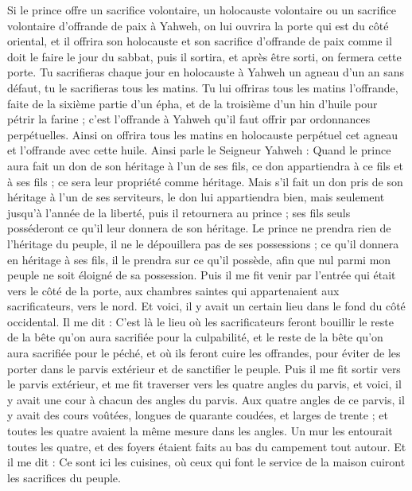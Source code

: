\begin{multicols}{2}
Si le prince offre un sacrifice volontaire, un holocauste volontaire ou un sacrifice volontaire d’offrande de paix à Yahweh, on lui ouvrira la porte qui est du côté oriental, et il offrira son holocauste et son sacrifice d’offrande de paix comme il doit le faire le jour du sabbat, puis il sortira, et après être sorti, on fermera cette porte.
Tu sacrifieras chaque jour en holocauste à Yahweh un agneau d'un an sans défaut, tu le sacrifieras tous les matins.
Tu lui offriras tous les matins l’offrande, faite de la sixième partie d'un épha, et de la troisième d'un hin d'huile pour pétrir la farine ; c'est l’offrande à Yahweh qu'il faut offrir par ordonnances perpétuelles.
Ainsi on offrira tous les matins en holocauste perpétuel cet agneau et l’offrande avec cette huile.
Ainsi parle le Seigneur Yahweh : Quand le prince aura fait un don de son héritage à l’un de ses fils, ce don appartiendra à ce fils et à ses fils ; ce sera leur propriété comme héritage.
Mais s'il fait un don pris de son héritage à l'un de ses serviteurs, le don lui appartiendra bien, mais seulement jusqu’à l’année de la liberté, puis il retournera au prince ; ses fils seuls posséderont ce qu’il leur donnera de son héritage.
Le prince ne prendra rien de l'héritage du peuple, il ne le dépouillera pas de ses possessions ; ce qu’il donnera en héritage à ses fils, il le prendra sur ce qu’il possède, afin que nul parmi mon peuple ne soit éloigné de sa possession.
Puis il me fit venir par l'entrée qui était vers le côté de la porte, aux chambres saintes qui appartenaient aux sacrificateurs, vers le nord. Et voici, il y avait un certain lieu dans le fond du côté occidental.
Il me dit : C'est là le lieu où les sacrificateurs feront bouillir le reste de la bête qu’on aura sacrifiée pour la culpabilité, et le reste de la bête qu’on aura sacrifiée pour le péché, et où ils feront cuire les offrandes, pour éviter de les porter dans le parvis extérieur et de sanctifier le peuple.
Puis il me fit sortir vers le parvis extérieur, et me fit traverser vers les quatre angles du parvis, et voici, il y avait une cour à chacun des angles du parvis.
Aux quatre angles de ce parvis, il y avait des cours voûtées, longues de quarante coudées, et larges de trente ; et toutes les quatre avaient la même mesure dans les angles.
Un mur les entourait toutes les quatre, et des foyers étaient faits au bas du campement tout autour.
Et il me dit : Ce sont ici les cuisines, où ceux qui font le service de la maison cuiront les sacrifices du peuple.

\end{multicols}
